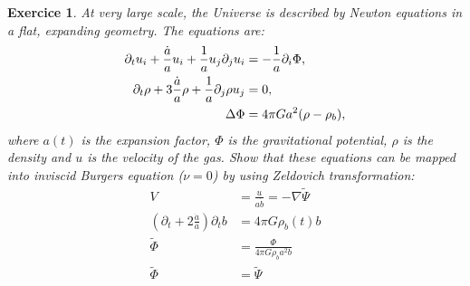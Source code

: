 \documentclass[10pt,a4paper]{article}
\newtheorem{exercici}{Exercice}
\theoremstyle{remark}
\begin{document}
\begin{exercici}
  At very large scale, the Universe is described by Newton equations in a flat, expanding geometry. The equations are:
  \begin{align}
    \partial_t u_i + \frac{\dot{a}}{a} u_i + \frac{1}{a} u_j \partial_j u_i      & = -\frac{1}{a} \partial_i \Phi,\label{eq:31} \\
    \partial_t \rho + 3 \frac{\dot{a}}{a} \rho + \frac{1}{a} \partial_j \rho u_j & = 0,\label{eq:32}                            \\
    \Delta \Phi                                                              & = 4\pi G a^2 (\rho - \rho_b),\label{eq:33}
  \end{align}
  where $a(t)$ is the expansion factor, $\Phi$ is the gravitational potential, $\rho$ is the density and $u$ is the velocity of the gas. Show that these equations can be mapped into inviscid Burgers equation ($\nu = 0$) by using Zeldovich transformation:
  \begin{align}
    V                                                                      & = \frac{u}{a\dot{b} } = -\nabla \tilde{\Psi} \\
    \label{eq:b}\left(\partial_t + 2 \frac{\dot{a}}{a}\right) \partial_t b & = 4\pi G \rho_b(t)b                          \\
    \tilde{\Phi}                                                           & = \frac{\Phi}{4\pi G \rho_b a^2 b}           \\
    \tilde{\Phi}                                                           & = \tilde{\Psi}
  \end{align}
\end{exercici}
\end{document}
